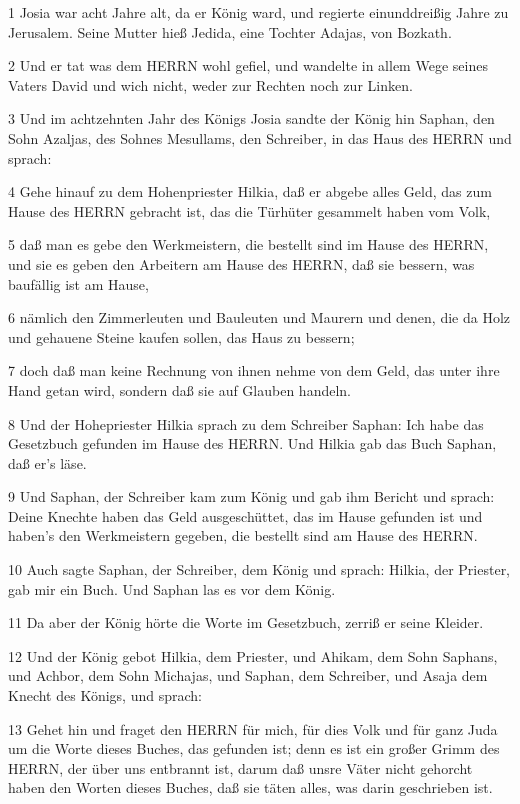 \par 1 Josia war acht Jahre alt, da er König ward, und regierte einunddreißig Jahre zu Jerusalem. Seine Mutter hieß Jedida, eine Tochter Adajas, von Bozkath.
\par 2 Und er tat was dem HERRN wohl gefiel, und wandelte in allem Wege seines Vaters David und wich nicht, weder zur Rechten noch zur Linken.
\par 3 Und im achtzehnten Jahr des Königs Josia sandte der König hin Saphan, den Sohn Azaljas, des Sohnes Mesullams, den Schreiber, in das Haus des HERRN und sprach:
\par 4 Gehe hinauf zu dem Hohenpriester Hilkia, daß er abgebe alles Geld, das zum Hause des HERRN gebracht ist, das die Türhüter gesammelt haben vom Volk,
\par 5 daß man es gebe den Werkmeistern, die bestellt sind im Hause des HERRN, und sie es geben den Arbeitern am Hause des HERRN, daß sie bessern, was baufällig ist am Hause,
\par 6 nämlich den Zimmerleuten und Bauleuten und Maurern und denen, die da Holz und gehauene Steine kaufen sollen, das Haus zu bessern;
\par 7 doch daß man keine Rechnung von ihnen nehme von dem Geld, das unter ihre Hand getan wird, sondern daß sie auf Glauben handeln.
\par 8 Und der Hohepriester Hilkia sprach zu dem Schreiber Saphan: Ich habe das Gesetzbuch gefunden im Hause des HERRN. Und Hilkia gab das Buch Saphan, daß er's läse.
\par 9 Und Saphan, der Schreiber kam zum König und gab ihm Bericht und sprach: Deine Knechte haben das Geld ausgeschüttet, das im Hause gefunden ist und haben's den Werkmeistern gegeben, die bestellt sind am Hause des HERRN.
\par 10 Auch sagte Saphan, der Schreiber, dem König und sprach: Hilkia, der Priester, gab mir ein Buch. Und Saphan las es vor dem König.
\par 11 Da aber der König hörte die Worte im Gesetzbuch, zerriß er seine Kleider.
\par 12 Und der König gebot Hilkia, dem Priester, und Ahikam, dem Sohn Saphans, und Achbor, dem Sohn Michajas, und Saphan, dem Schreiber, und Asaja dem Knecht des Königs, und sprach:
\par 13 Gehet hin und fraget den HERRN für mich, für dies Volk und für ganz Juda um die Worte dieses Buches, das gefunden ist; denn es ist ein großer Grimm des HERRN, der über uns entbrannt ist, darum daß unsre Väter nicht gehorcht haben den Worten dieses Buches, daß sie täten alles, was darin geschrieben ist.
